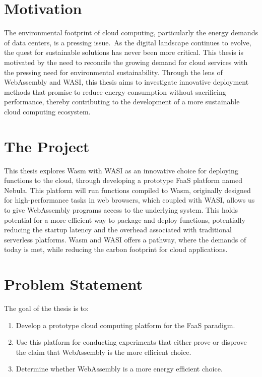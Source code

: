 \documentclass[
  table]{report}
\providecommand{\tightlist}{%
  \setlength{\itemsep}{0pt}\setlength{\parskip}{0pt}}
\begin{document}
\section{Motivation}
\label{sect:motivation}

The environmental footprint of cloud computing, particularly the energy
demands of data centers, is a pressing issue.~As the digital landscape
continues to evolve, the quest for sustainable solutions has never been
more critical. This thesis is motivated by the need to reconcile the
growing demand for cloud services with the pressing need for
environmental sustainability. Through the lens of WebAssembly and
\ac{WASI}, this thesis aims to investigate innovative deployment methods
that promise to reduce energy consumption without sacrificing
performance, thereby contributing to the development of a more
sustainable cloud computing ecosystem.

\section{The Project}
\label{sect:project}

This thesis explores \ac{Wasm} with \ac{WASI} as an innovative choice
for deploying functions to the cloud, through developing a prototype
\ac{FaaS} platform named Nebula. This platform will run functions
compiled to \ac{Wasm}, originally designed for high-performance tasks in
web browsers, which coupled with \ac{WASI}, allows us to give
WebAssembly programs access to the underlying system. This holds
potential for a more efficient way to package and deploy functions,
potentially reducing the startup latency and the overhead associated
with traditional serverless platforms. \ac{Wasm} and \ac{WASI} offers a
pathway, where the demands of today is met, while reducing the carbon
footprint for cloud applications.

\section{Problem Statement}
\label{sect:problems}

The goal of the thesis is to:

\begin{enumerate}
\def\labelenumi{\arabic{enumi}.}
\tightlist
\item
  Develop a prototype cloud computing platform for the \ac{FaaS}
  paradigm.
\item
  Use this platform for conducting experiments that either prove or
  disprove the claim that WebAssembly is the more efficient choice.
\item
  Determine whether WebAssembly is a more energy efficient choice.
\end{enumerate}
\end{document}
